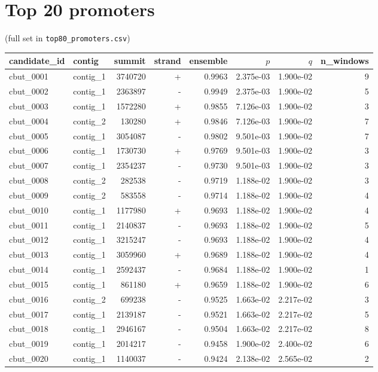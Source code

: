 \documentclass{article}
\begin{document}
\section*{Top 20 promoters}
(full set in \texttt{top80\_promoters.csv})
\begin{center}
\begin{tabular}{llrrrrrr}
\toprule
candidate\_id & contig & summit & strand & ensemble & $p$ & $q$ & n\_windows \\
\midrule
cbut\_0001 & contig\_1 & 3740720 & + & 0.9963 & 2.375e-03 & 1.900e-02 & 9 \\
cbut\_0002 & contig\_1 & 2363897 & - & 0.9949 & 2.375e-03 & 1.900e-02 & 5 \\
cbut\_0003 & contig\_1 & 1572280 & + & 0.9855 & 7.126e-03 & 1.900e-02 & 3 \\
cbut\_0004 & contig\_2 & 130280 & + & 0.9846 & 7.126e-03 & 1.900e-02 & 7 \\
cbut\_0005 & contig\_1 & 3054087 & - & 0.9802 & 9.501e-03 & 1.900e-02 & 7 \\
cbut\_0006 & contig\_1 & 1730730 & + & 0.9769 & 9.501e-03 & 1.900e-02 & 3 \\
cbut\_0007 & contig\_1 & 2354237 & - & 0.9730 & 9.501e-03 & 1.900e-02 & 3 \\
cbut\_0008 & contig\_2 & 282538 & - & 0.9719 & 1.188e-02 & 1.900e-02 & 3 \\
cbut\_0009 & contig\_2 & 583558 & - & 0.9714 & 1.188e-02 & 1.900e-02 & 4 \\
cbut\_0010 & contig\_1 & 1177980 & + & 0.9693 & 1.188e-02 & 1.900e-02 & 4 \\
cbut\_0011 & contig\_1 & 2140837 & - & 0.9693 & 1.188e-02 & 1.900e-02 & 5 \\
cbut\_0012 & contig\_1 & 3215247 & - & 0.9693 & 1.188e-02 & 1.900e-02 & 4 \\
cbut\_0013 & contig\_1 & 3059960 & + & 0.9689 & 1.188e-02 & 1.900e-02 & 4 \\
cbut\_0014 & contig\_1 & 2592437 & - & 0.9684 & 1.188e-02 & 1.900e-02 & 1 \\
cbut\_0015 & contig\_1 & 861180 & + & 0.9659 & 1.188e-02 & 1.900e-02 & 6 \\
cbut\_0016 & contig\_2 & 699238 & - & 0.9525 & 1.663e-02 & 2.217e-02 & 3 \\
cbut\_0017 & contig\_1 & 2139187 & - & 0.9521 & 1.663e-02 & 2.217e-02 & 5 \\
cbut\_0018 & contig\_1 & 2946167 & - & 0.9504 & 1.663e-02 & 2.217e-02 & 8 \\
cbut\_0019 & contig\_1 & 2014217 & - & 0.9458 & 1.900e-02 & 2.400e-02 & 6 \\
cbut\_0020 & contig\_1 & 1140037 & - & 0.9424 & 2.138e-02 & 2.565e-02 & 2 \\
\bottomrule
\end{tabular}
\end{center}
\end{document}

